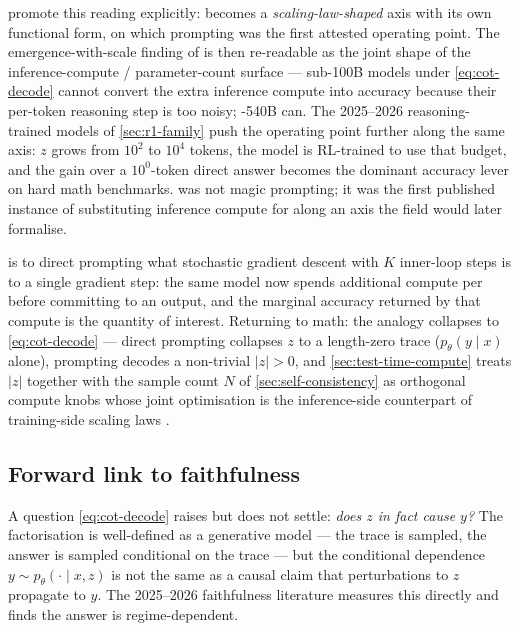 \citet{snell2024} promote this reading explicitly: 
becomes a \emph{scaling-law-shaped} axis with its own functional form,
on which  prompting was the first attested operating point. The
emergence-with-scale finding of
\citet[\S 3.3]{wei2022-cot} is then re-readable as the joint shape of
the inference-compute / parameter-count surface — sub-100B models
under \cref{eq:cot-decode} cannot convert the extra inference compute
into accuracy because their per-token reasoning step is too noisy;
-540B can. The 2025--2026 reasoning-trained models of
\cref{sec:r1-family} push the operating point further along the same
axis: $z$ grows from $10^2$ to $10^4$ tokens, the model is RL-trained
to use that budget, and the gain over a $10^0$-token direct answer
becomes the dominant accuracy lever on hard math benchmarks.  was
not magic prompting; it was the first published instance of substituting
inference compute for  along an axis the field would later
formalise.

\begin{analogy}
 is to direct prompting what stochastic gradient descent with $K$
inner-loop steps is to a single gradient step: the same model now
spends additional compute per  before committing to an output,
and the marginal accuracy returned by that compute is the quantity
of interest. Returning to math: the analogy collapses to
\cref{eq:cot-decode} — direct prompting collapses $z$ to a length-zero
trace ($p_\theta(y \mid x)$ alone),  prompting decodes a non-trivial
$|z| > 0$, and \cref{sec:test-time-compute} treats $|z|$ together with
the sample count $N$ of \cref{sec:self-consistency} as orthogonal
compute knobs whose joint optimisation is the inference-side
counterpart of training-side scaling laws \citep[\S 1]{snell2024}.
\end{analogy}

\subsection{Forward link to faithfulness}
\label{sec:cot-faith-forward}

A question \cref{eq:cot-decode} raises but does not settle: \emph{does
$z$ in fact cause $y$?} The factorisation is well-defined as a
generative model — the trace is sampled, the answer is sampled
conditional on the trace — but the conditional dependence
$y \sim p_\theta(\cdot \mid x, z)$ is not the same as a causal claim
that perturbations to $z$ propagate to $y$. The 2025--2026 faithfulness
literature \citep{arcuschin2025-cot-wild,shen2025-faithcot-bench,
mehta2026-faithfulness-scaling} measures this directly and finds the
answer is regime-dependent.


